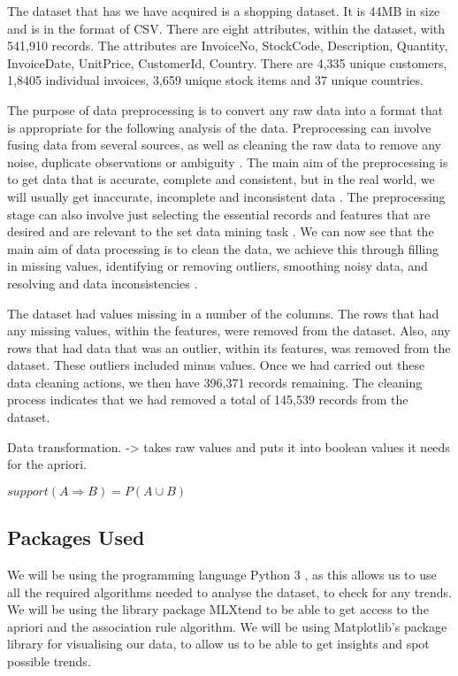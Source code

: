 \documentclass[a4paper,10pt]{article}
\begin{document}
The dataset that has we have acquired is a shopping dataset. It is 44MB in size and is in the format of CSV. There are eight attributes, within the dataset, with 541,910 records. The attributes are InvoiceNo, StockCode, Description, Quantity, InvoiceDate, UnitPrice, CustomerId, Country. There are 4,335 unique customers, 1,8405 individual invoices, 3,659 unique stock items and 37 unique countries.

The purpose of data preprocessing is to convert any raw data into a format that is appropriate for the following analysis of the data. Preprocessing can involve fusing data from several sources, as well as cleaning the raw data to remove any noise, duplicate observations or ambiguity \cite{tan2016introduction}. The main aim of the preprocessing is to get data that is accurate, complete and consistent, but in the real world, we will usually get inaccurate, incomplete and inconsistent data \cite{han2011data}. The preprocessing stage can also involve just selecting the essential records and features that are desired and are relevant to the set data mining task \cite{tan2016introduction}. We can now see that the main aim of data processing is to clean the data, we achieve this through filling in missing values, identifying or removing outliers, smoothing noisy data, and resolving and data inconsistencies \cite{han2011data}.

The dataset had values missing in a number of the columns. The rows that had any missing values, within the features, were removed from the dataset. Also, any rows that had data that was an outlier, within its features, was removed from the dataset. These outliers included minus values. Once we had carried out these data cleaning actions, we then have 396,371 records remaining. The cleaning process indicates that we had removed a total of 145,539 records from the dataset. 

Data transformation. -> takes raw values and puts it into boolean values it needs for the apriori.

$support(A \Rightarrow B) = P(A \cup B)$

\subsection{Packages Used}

We will be using the programming language Python 3 \cite{Python}, as this allows us to use all the required algorithms needed to analyse the dataset, to check for any trends. We will be using the library package MLXtend\cite{raschkas_2018_mlxtend} to be able to get access to the apriori and the association rule algorithm. We will be using Matplotlib's \cite{hunter2007matplotlib} package library for visualising our data, to allow us to be able to get insights and spot possible trends.
\end{document}

